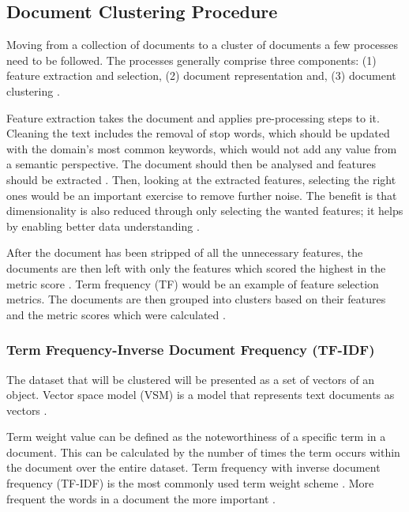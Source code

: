 \subsection{Document Clustering Procedure}

Moving from a collection of documents to a cluster of documents a few processes need to be followed. The processes generally comprise three components: (1) feature extraction and selection, (2) document representation and, (3) document clustering \cite{shah2012document}.

Feature extraction takes the document and applies pre-processing steps to it. Cleaning the text includes the removal of stop words, which should be updated with the domain’s most common keywords, which would not add any value from a semantic perspective. The document should then be analysed and features should be extracted \cite{mugunthadevi2011survey}. Then, looking at the extracted features, selecting the right ones would be an important exercise to remove further noise. The benefit is that dimensionality is also reduced through only selecting the wanted features; it helps by enabling better data understanding \cite{wei2006combining}.

After the document has been stripped of all the unnecessary features, the documents are then left with only the features which scored the highest in the metric score \cite{Shah2013}. Term frequency (TF) would be an example of feature selection metrics. The documents are then grouped into clusters based on their features and the metric scores which were calculated \cite{wei2006combining}.

\subsubsection{Term Frequency-Inverse Document Frequency (TF-IDF)}

The dataset that will be clustered will be presented as a set of vectors of an object. Vector space model (VSM) is a model that represents text documents as vectors \cite{clark2015vector}.

Term weight value can be defined as the noteworthiness of a specific term in a document. This can be calculated by the number of times the term occurs within the document over the entire dataset. Term frequency with inverse document frequency (TF-IDF) is the most commonly used term weight scheme \cite{cui2005document}. More frequent the words in a document the more important \cite{peng2006recent}.


